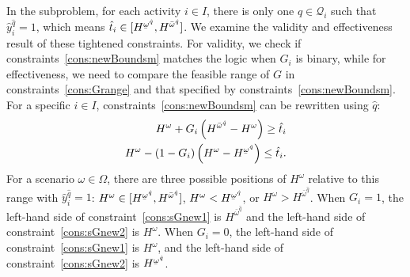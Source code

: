 \documentclass[11pt]{article}
\renewcommand{\underbar}{\underaccent{\bar}}
\begin{document}
	In the subproblem, for each activity \(i \in I\), there is only one \(\hat{q} \in \mathcal{Q}_i\) such that \(\hat{y}_i^{\hat{q}} = 1\), which means \(\hat{t}_i \in [H^{\underbar{\omega}^{\hat{q}}},H^{\bar{\omega}^{\hat{q}}}]\). We examine the validity and effectiveness result of these tightened constraints. For validity, we check if constraints~\eqref{cons:newBoundsm} matches the logic when \(G_i\) is binary, while for effectiveness, we need to compare the feasible range of \(G\) in constraints~\eqref{cons:Grange} and that specified by constraints~\eqref{cons:newBoundsm}. \\
	\newline
	For a specific \(i \in I\), constraints~\eqref{cons:newBoundsm} can be rewritten using \(\hat{q}\):
	\begin{subequations} \label{cons:sGnew}
		\begin{align}
		H^\omega + G_i \left( H^{\bar{\omega}^{\hat{q}}} - H^\omega \right) \geq \hat{t}_i \label{cons:sGnew1}\\
		H^\omega - (1 - G_i) \left(H^\omega - H^{\underbar{\omega}^{\hat{q}}} \right) \leq \hat{t}_i. \label{cons:sGnew2}
		\end{align}
	\end{subequations}
	For a scenario \(\omega \in \Omega\), there are three possible positions of \(H^\omega\) relative to this range with \(\hat{y}_i^{\hat{q}} = 1\): \(H^\omega \in [H^{\underbar{\omega}^{\hat{q}}},H^{\bar{\omega}^{\hat{q}}}]\), \(H^\omega < H^{\underbar{\omega}^{\hat{q}}}\), or \(H^\omega > H^{\bar{\omega}^{\hat{q}}}\). When \(G_i = 1\), the left-hand side of constraint~\eqref{cons:sGnew1} is \(H^{\bar{\omega}^{\hat{q}}}\) and the left-hand side of constraint~\eqref{cons:sGnew2} is \(H^\omega\). When \(G_i = 0\), the left-hand side of constraint~\eqref{cons:sGnew1} is \(H^\omega\), and the left-hand side of constraint~\eqref{cons:sGnew2} is \(H^{\underbar{\omega}^{\hat{q}}}\).
\end{document}
